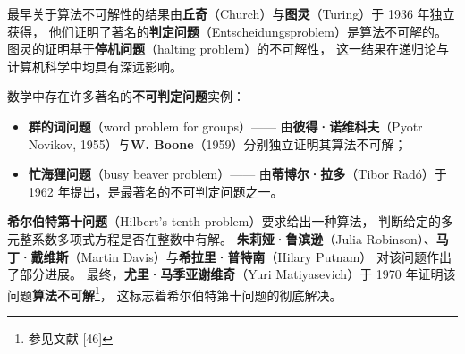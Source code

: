 最早关于算法不可解性的结果由\textbf{丘奇}（Church）与\textbf{图灵}（Turing）于 1936 年独立获得，
他们证明了著名的\textbf{判定问题}（Entscheidungsproblem）是算法不可解的。  
图灵的证明基于\textbf{停机问题}（halting problem）的不可解性，
这一结果在递归论与计算机科学中均具有深远影响。

数学中存在许多著名的\textbf{不可判定问题}实例：
\begin{itemize}
  \item \textbf{群的词问题}（word problem for groups）——
  由\textbf{彼得·诺维科夫}（Pyotr Novikov, 1955）与\textbf{W. Boone}（1959）分别独立证明其算法不可解；
  \item \textbf{忙海狸问题}（busy beaver problem）——
  由\textbf{蒂博尔·拉多}（Tibor Radó）于 1962 年提出，是最著名的不可判定问题之一。
\end{itemize}

\textbf{希尔伯特第十问题}（Hilbert’s tenth problem）要求给出一种算法，
判断给定的多元整系数多项式方程是否在整数中有解。  
\textbf{朱莉娅·鲁滨逊}（Julia Robinson）、\textbf{马丁·戴维斯}（Martin Davis）与\textbf{希拉里·普特南}（Hilary Putnam）  
对该问题作出了部分进展。  
最终，\textbf{尤里·马季亚谢维奇}（Yuri Matiyasevich）于 1970 年证明该问题\textbf{算法不可解}\footnote{参见文献 [46]}，
这标志着希尔伯特第十问题的彻底解决。

